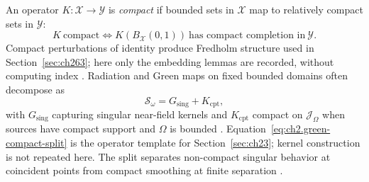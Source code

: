 An operator \(K:\mathcal{X}\to\mathcal{Y}\) is \emph{compact} if bounded sets in \(\mathcal{X}\) map to relatively compact sets in \(\mathcal{Y}\):
\begin{equation}
\label{eq:ch2.compact-operator-def}
K\ \text{compact}
\iff
K(B_{\mathcal{X}}(0,1))\ \text{has compact completion in}\ \mathcal{Y}.
\end{equation}
Compact perturbations of identity produce Fredholm structure used in Section~\ref{sec:ch263}; here only the embedding lemmas are recorded, without computing index \cite{harrington2001}. Radiation and Green maps on fixed bounded domains often decompose as
\begin{equation}
\label{eq:ch2.green-compact-split}
\mathcal{S}_\omega
=
G_{\mathrm{sing}}+K_{\mathrm{cpt}},
\end{equation}
with \(G_{\mathrm{sing}}\) capturing singular near-field kernels and \(K_{\mathrm{cpt}}\) compact on \(\mathcal{J}_\Omega\) when sources have compact support and \(\Omega\) is bounded \cite{stratton1941}. Equation~\eqref{eq:ch2.green-compact-split} is the operator template for Section~\ref{sec:ch23}; kernel construction is not repeated here. The split separates non-compact singular behavior at coincident points from compact smoothing at finite separation \cite{harrington2001}.

